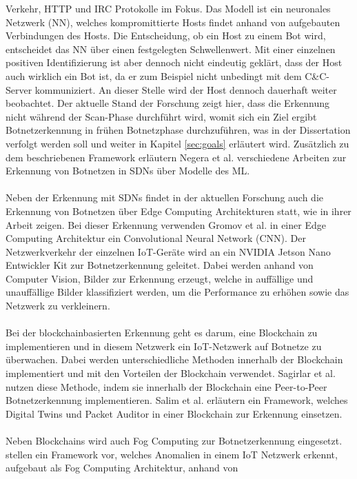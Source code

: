 Verkehr, HTTP und IRC Protokolle im Fokus. Das Modell ist ein neuronales Netzwerk (NN), welches kompromittierte Hosts findet anhand von aufgebauten Verbindungen des Hosts. Die Entscheidung,
ob ein Host zu einem Bot wird, entscheidet das NN über einen festgelegten Schwellenwert. Mit einer einzelnen positiven Identifizierung ist aber dennoch nicht eindeutig geklärt, dass der
Host auch wirklich ein Bot ist, da er zum Beispiel nicht unbedingt mit dem C\&C-Server kommuniziert. An dieser Stelle wird der Host dennoch dauerhaft weiter beobachtet. Der aktuelle Stand der
Forschung zeigt hier, dass die Erkennung nicht während der Scan-Phase durchführt wird, womit sich ein Ziel ergibt Botnetzerkennung in frühen Botnetzphase durchzuführen, was in der Dissertation
verfolgt werden soll und weiter in Kapitel \ref{sec:goals} erläutert wird. Zusätzlich zu dem beschriebenen Framework erläutern Negera et al. \cite{DBLP:journals/sensors/NegeraSDMA22} verschiedene
Arbeiten zur Erkennung von Botnetzen in SDNs über Modelle des ML. \\ \\ Neben der Erkennung mit SDNs findet in der aktuellen Forschung auch die Erkennung von Botnetzen über Edge Computing
Architekturen statt, wie \cite{gromov2022edge} in ihrer Arbeit zeigen. Bei dieser Erkennung verwenden Gromov et al. in einer Edge Computing Architektur ein Convolutional Neural Network (CNN). Der
Netzwerkverkehr der einzelnen IoT-Geräte wird an ein NVIDIA Jetson Nano Entwickler Kit zur Botnetzerkennung geleitet. Dabei werden anhand von Computer Vision, Bilder zur Erkennung erzeugt, welche in
auffällige und unauffällige Bilder klassifiziert werden, um die Performance zu erhöhen sowie das Netzwerk zu verkleinern. \\ \\ Bei der blockchainbasierten Erkennung geht es darum, eine Blockchain zu
implementieren und in diesem Netzwerk ein IoT-Netzwerk auf Botnetze zu überwachen. Dabei werden unterschiedliche Methoden innerhalb der Blockchain implementiert und mit den Vorteilen der Blockchain
verwendet. Sagirlar et al. \cite{DBLP:journals/corr/abs-1809-10775} nutzen diese Methode, indem sie innerhalb der Blockchain eine Peer-to-Peer Botnetzerkennung implementieren. Salim et al.
\cite{DBLP:journals/sensors/SalimATPP22} erläutern ein Framework, welches Digital Twins und Packet Auditor in einer Blockchain zur Erkennung einsetzen. \\ \\ Neben Blockchains wird auch Fog 
Computing zur Botnetzerkennung eingesetzt. \cite{Lawal2020AnAM} stellen ein Framework vor, welches Anomalien in einem IoT Netzwerk erkennt, aufgebaut als Fog Computing Architektur, anhand von
